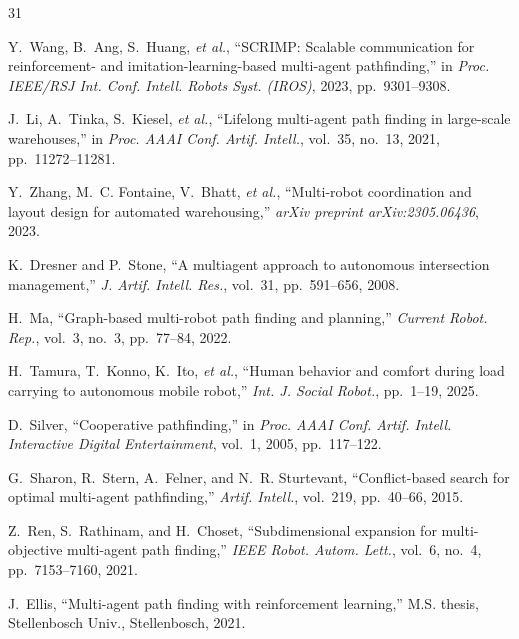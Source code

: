 \documentclass[sigconf]{acmart}
\newcommand{\etal}{\textit{et al.}}
\begin{document}

{\small
\begin{thebibliography}{31}

Y.~Wang, B.~Ang, S.~Huang, \etal,
``SCRIMP: Scalable communication for reinforcement- and
imitation-learning-based multi-agent pathfinding,''
in \emph{Proc. IEEE/RSJ Int. Conf. Intell. Robots Syst. (IROS)},
2023, pp.~9301--9308.

J.~Li, A.~Tinka, S.~Kiesel, \etal,
``Lifelong multi-agent path finding in large-scale warehouses,''
in \emph{Proc. AAAI Conf. Artif. Intell.}, vol.~35, no.~13,
2021, pp.~11272--11281.

Y.~Zhang, M.~C. Fontaine, V.~Bhatt, \etal,
``Multi-robot coordination and layout design for automated
warehousing,''
\emph{arXiv preprint arXiv:2305.06436}, 2023.

K.~Dresner and P.~Stone,
``A multiagent approach to autonomous intersection management,''
\emph{J. Artif. Intell. Res.}, vol.~31, pp.~591--656, 2008.

H.~Ma,
``Graph-based multi-robot path finding and planning,''
\emph{Current Robot. Rep.}, vol.~3, no.~3, pp.~77--84, 2022.

H.~Tamura, T.~Konno, K.~Ito, \etal,
``Human behavior and comfort during load carrying to autonomous
mobile robot,''
\emph{Int. J. Social Robot.}, pp.~1--19, 2025.

D.~Silver,
``Cooperative pathfinding,''
in \emph{Proc. AAAI Conf. Artif. Intell. Interactive Digital
Entertainment}, vol.~1, 2005, pp.~117--122.

G.~Sharon, R.~Stern, A.~Felner, and N.~R. Sturtevant,
``Conflict-based search for optimal multi-agent pathfinding,''
\emph{Artif. Intell.}, vol.~219, pp.~40--66, 2015.

Z.~Ren, S.~Rathinam, and H.~Choset,
``Subdimensional expansion for multi-objective multi-agent path
finding,''
\emph{IEEE Robot. Autom. Lett.}, vol.~6, no.~4,
pp.~7153--7160, 2021.

J.~Ellis,
``Multi-agent path finding with reinforcement learning,''
M.S. thesis, Stellenbosch Univ., Stellenbosch, 2021.


\end{thebibliography}}
\end{document}
